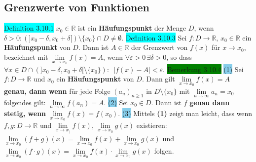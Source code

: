 \documentclass[landscape, 10pt]{article}
\newcommand{\R}{\mathbb{R}}
\begin{document}
\begin{multicols}{3}
\subsection{Grenzwerte von Funktionen}
\colorbox{cyan}{Definition 3.10.1} \textcolor{NavyBlue}{$x_0\in\R$} 
                ist ein \textbf{Häufungspunkt} 
                der Menge \textcolor{NavyBlue}{$D$}, wenn \textcolor{NavyBlue}{
                $\delta>0:(]x_0-\delta,x_0+\delta[)\setminus\{x_0\}\cap D\neq\emptyset$}. 
\colorbox{cyan}{Definition 3.10.3} Sei 
                \textcolor{NavyBlue}{$f:D\longrightarrow\R,\,x_0\in\R$}
                ein \textbf{Häufungspunkt} von \textcolor{NavyBlue}{$D$}.
                Dann ist \textcolor{NavyBlue}{$A\in\R$} der Grenzwert von 
         \textcolor{NavyBlue}{$f(x)$} für \textcolor{NavyBlue}{$x\to x_0$}, 
                bezeichnet mit \textcolor{NavyBlue}{$\lim\limits_{x\to x_0}f(x)=A$}, 
                wenn \textcolor{NavyBlue}{$\forall\varepsilon>0\,\exists\delta>0$}, so dass 
         \textcolor{NavyBlue}{
                $\forall x\in D\cap(]x_0-\delta,x_0+\delta[\setminus\{x_0\}):\enspace
                |f(x)-A|<\varepsilon$}.
\colorbox{green}{Bemerkung 3.10.4} \colorbox{SkyBlue}{(1)} Sei 
                \textcolor{NavyBlue}{$f:D\longrightarrow\R$} und 
                \textcolor{NavyBlue}{$x_0$} ein \textbf{Häufungspunkt} von $D$. 
                Dann gilt \textcolor{NavyBlue}{$\lim\limits_{x\to x_0}f(x)=A$} 
                \textbf{genau, 
         dann wenn} für jede Folge \textcolor{NavyBlue}{$(a_n)_{n\geqslant1}$} 
                in \textcolor{NavyBlue}{$D\setminus\{x_0\}$} mit 
                \textcolor{NavyBlue}{$\lim\limits_{n\to\infty}a_n=x_0$} folgendes gilt: 
                \textcolor{NavyBlue}{$\lim\limits_{n\to\infty}f(a_n)=A$}. 
         \colorbox{SkyBlue}{(2)} Sei \textcolor{NavyBlue}{$x_0\in D$}. 
                Dann ist \textcolor{NavyBlue}{$f$} \textbf{genau dann stetig, 
                wenn} \textcolor{NavyBlue}{$\lim\limits_{x\to x_0}f(x)=f(x_0)$}. 
         \colorbox{SkyBlue}{(3)} Mittels \textbf{(1)} zeigt man leicht, 
                dass wenn \textcolor{NavyBlue}{$f,g:D\longrightarrow\R$} 
                und 
                \textcolor{NavyBlue}{$\lim\limits_{x\to x_)}f(x),\,\lim\limits_{x\to x_0}g(x)$}
                existieren: 
         \textcolor{NavyBlue}{$\lim\limits_{x\to x_0}(f+g)(x)
                =\lim\limits_{x\to x_0}f(x)+\lim\limits_{x\to x_0}g(x)$} und
                \textcolor{NavyBlue}{$\lim\limits_{x\to x_0}(f\cdot g)(x)
                =\lim\limits_{x\to x_0}f(x)\cdot\lim\limits_{x\to x_0}g(x)$} folgen.

\end{multicols}
\end{document}
